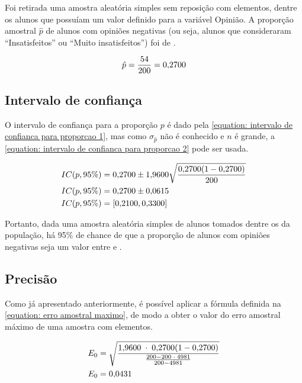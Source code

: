 

	Foi retirada uma amostra aleatória simples sem reposição com \CINCOn
	elementos, dentre os \CINCON alunos que possuíam um valor definido para
	a variável Opinião.  A proporção amostral $\hat{p}$ de alunos com
	opiniões negativas (ou seja, alunos que consideraram ``Insatisfeitos''
	ou ``Muito insatisfeitos'') foi de \CINCOpAmostral.

	\begin{align*} 
		\hat{p}  &= {\frac{54}{200}} = \num{0.27} \nonumber \\
	\end{align*}

\subsection{Intervalo de confiança}

	O intervalo de confiança para a proporção $p$ é dado pela
    \autoref{equation: intervalo de confianca para proporcao 1}, mas como $\sigma_{\hat{p}}$ 
    não é conhecido e $n$ é grande, a 
    \autoref{equation: intervalo de confianca para proporcao 2} pode ser usada.

	\begin{align} 
		IC(p, 95\%) 
					&= \num{0.27} \pm \num{1.96} \sqrt{\frac{\num{0.27} (1- \num{0.27})}{200}} \nonumber \\
		IC(p, 95\%)			&= \num{0.27} \pm \num{0.0615} \nonumber \\
					\label{eq:cinco-a-result}
		IC(p, 95\%)			&= [\num{0.21}, \num{0.33}]
	\end{align}

	Portanto, dada uma amostra aleatória simples de \CINCOn alunos tomados
	dentre os \CINCON da população, há 95\% de chance de que a proporção de
	alunos com opiniões negativas seja um valor entre \CINCOAICinf e
	\CINCOAICsup.

\subsection{Precisão}

	Como já apresentado anteriormente, é possível aplicar a fórmula
    definida na \autoref{equation: erro amostral maximo}, de modo a obter
    o valor do erro amostral máximo de uma amostra com \CINCOn elementos.

	\begin{align}
		\label{eq:cinco-b-e0-calc}
		E_0 &= \sqrt{\frac{\num{1.96} \;\cdot\; \num{0.27} (1 - \num{0.27}) }{\frac{200 - 200 \;\cdot\; 4981}{200 - 4981}}} \\
	    E_0		&= \num{0.0431} \nonumber
	\end{align}

